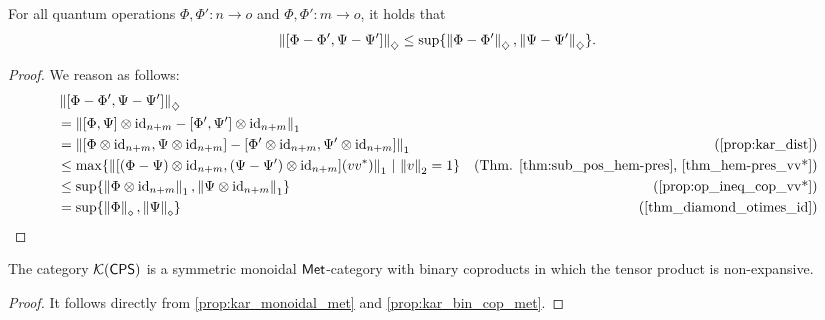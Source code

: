 \begin{proposition} \label{prop:kar_bin_cop_met}
  For all quantum operations $\Phi, \Phi': n \to o  $ and $\Phi, \Phi': m \to o $, it holds that
  \[ \left\lVert [\Phi-\Phi',\Psi-\Psi'] \right\rVert_{\diamondsuit} \leq \sup\{\left\lVert \Phi-\Phi' \right\rVert_{\diamondsuit},  \left\lVert \Psi-\Psi' \right\rVert_{\diamondsuit} \}.\]
\end{proposition}

\begin{proof}
  We reason as follows:
  \begin{equation*}
  \begin{split}
        & \diamondnorm{[\Phi-\Phi' ,\Psi-\Psi']} \\
        & =
        \tracenorm{[\Phi,\Psi] \otimes \id_{n+m} - [\Phi',\Psi'] \otimes \id_{n+m} }
        \\
        & = 
        \tracenorm{[\Phi \otimes \id_{n+m},\Psi \otimes \id_{n+m}] - [\Phi' \otimes \id_{n+m},\Psi' \otimes \id_{n+m}] } & (\text{\autoref{prop:kar_dist}})
        \\
        & \leq \max \{ \tracenorm{[(\Phi - \Psi) \otimes \id_{n+m} ,(\Psi - \Psi') \otimes \id_{n+m}] (vv^*)} \, | \, \euclideannorm{v}=1\}  & (\text{Thm. \ref{thm:sub_pos_hem-pres}, \ref{thm_hem-pres_vv*}})\\
        & \leq
        \sup \{ \tracenorm{\Phi \otimes \id_{n+m}}, \tracenorm{\Psi \otimes \id_{n+m}} \} & (\text{\autoref{prop:op_ineq_cop_vv*}})
        \\
        & =
        \sup \{ \norm{\Phi}_\diamond, \norm{\Psi}_\diamond \} & (\text{\autoref{thm_diamond_otimes_id}})
\end{split}
\end{equation*}
\end{proof}

\begin{theorem} 
  The category $\mathcal{K}{(\mathsf{CPS})}$ is a  symmetric monoidal $\mathsf{Met}$-category with binary coproducts in which  the tensor product is non-expansive.
\end{theorem}

\begin{proof}
  It follows directly from \autoref{prop:kar_monoidal_met} and \autoref{prop:kar_bin_cop_met}.
\end{proof}







